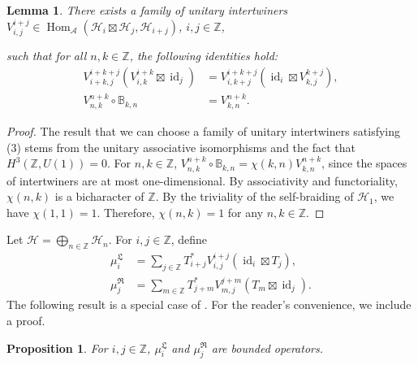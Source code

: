 \documentclass{article}
\newtheorem{proposition}{Proposition}
\newtheorem{lemma}{Lemma}
\newcommand{\hilb}{\mathcal{H}}
\newcommand{\A}{\mathcal{A}}
\newcommand{\Z}{\mathbb{Z}}
\begin{document}
\begin{lemma}{\label{associativity and Frobenius}}
There exists a family of unitary intertwiners \(V_{i,j}^{i+j}\in \operatorname{Hom}_{\A}(\hilb_i \boxtimes \hilb_j, \hilb_{i+j})\), \(i,j\in\mathbb Z\), 

    such that for all $n,k \in\Z$, the following identities hold: 
    \begin{align}
    V^{i+k+j}_{i+k,j}(V^{i+k}_{i,k}\boxtimes \operatorname{id}_j) &=   V^{i+k+j}_{i, k+j}(\operatorname{id}_i\boxtimes V^{k+j}_{k,j}), \\
    V^{n+k}_{n,k} \circ \mathbb{B}_{k,n} & = V^{n+k}_{k,n}.
\end{align}
\end{lemma}
\begin{proof}
    The result that we can choose a family of unitary intertwiners satisfying (3) stems from  the unitary associative isomorphisms and the fact that 
    $H^3(\Z, U(1))  = 0$.  For $n,k\in\Z$,  $V^{n+k}_{n,k} \circ \mathbb{B}_{k,n}  = \chi(k,n)V^{n+k}_{k,n}$, since the 
    spaces of intertwiners are at most one-dimensional. By associativity and functoriality, $\chi(n,k)$ is a bicharacter of $\Z$. By the triviality of the self-braiding of $\hilb_1$, we have
    $\chi(1,1) = 1$. Therefore, $\chi(n,k) = 1$ for any $n,k\in\Z.$
\end{proof}
Let $\hilb = \bigoplus_{n\in\Z}\hilb_{n}$. For $i,j\in \Z$, define 
\begin{align*}
    \mu_i^{\mathfrak{L}} &= \sum_{j\in\Z}T_{i+j}^*V_{i,j}^{i+j}(\operatorname{id}_i\boxtimes T_j) ,\\
    \mu_j^{\mathfrak{R}} &= \sum_{m\in\Z} T_{j+m}^*V^{j+m}_{m,j}(T_m\boxtimes \operatorname{id}_j).
\end{align*}
The following result is a special case of \cite[Lemma $2.2$]{masuda2000generalization}. For the reader's convenience, we include a proof.
\begin{proposition}\label{bddoperator}
    For $i,j\in \Z$, $\mu_i^{\mathfrak{L}}$ and $\mu_j^{\mathfrak{R}}$ are bounded operators.
\end{proposition}
\end{document}
